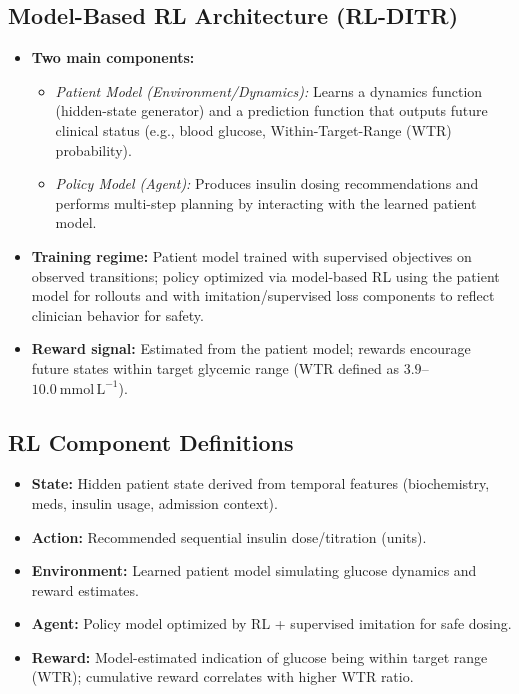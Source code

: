 \subsection*{Model-Based RL Architecture (RL-DITR)}
\begin{itemize}
    \item \textbf{Two main components:}
    \begin{itemize}
        \item \emph{Patient Model (Environment/Dynamics):} Learns a dynamics function (hidden-state generator) and a prediction function that outputs future clinical status (e.g., blood glucose, Within-Target-Range (WTR) probability).
        \item \emph{Policy Model (Agent):} Produces insulin dosing recommendations and performs multi-step planning by interacting with the learned patient model.
    \end{itemize}
    \item \textbf{Training regime:} Patient model trained with supervised objectives on observed transitions; policy optimized via model-based RL using the patient model for rollouts and with imitation/supervised loss components to reflect clinician behavior for safety.
    \item \textbf{Reward signal:} Estimated from the patient model; rewards encourage future states within target glycemic range (WTR defined as $3.9$--$10.0\ \mathrm{mmol\,L^{-1}}$).
\end{itemize}

\subsection*{RL Component Definitions}
\begin{itemize}
    \item \textbf{State:} Hidden patient state derived from temporal features (biochemistry, meds, insulin usage, admission context).
    \item \textbf{Action:} Recommended sequential insulin dose/titration (units).
    \item \textbf{Environment:} Learned patient model simulating glucose dynamics and reward estimates.
    \item \textbf{Agent:} Policy model optimized by RL + supervised imitation for safe dosing.
    \item \textbf{Reward:} Model-estimated indication of glucose being within target range (WTR); cumulative reward correlates with higher WTR ratio.
\end{itemize}


